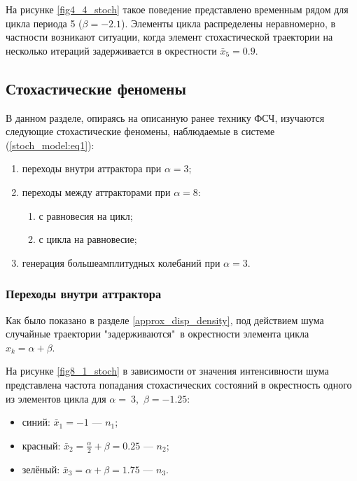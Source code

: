 \documentclass[a4paper, 14pt]{extreport}
\numberwithin{equation}{section}
\numberwithin{figure}{section}
\numberwithin{table}{section}
\begin{document}
				На рисунке \ref{fig4_4_stoch} такое поведение представлено временным рядом для цикла периода 5 ($ \beta = -2.1 $). Элементы цикла распределены неравномерно, в частности возникают ситуации, когда элемент стохастической траектории на несколько итераций задерживается в окрестности $ \bar{x}_{5} = 0.9 $.


		\newpage

		\subsection{Стохастические феномены}
		\label{stoch_phen}
			В данном разделе, опираясь на описанную ранее технику ФСЧ, изучаются следующие стохастические феномены, наблюдаемые в системе (\ref{stoch_model:eq1}):
			\begin{enumerate}
				\item переходы внутри аттрактора при $ \alpha = 3 $;
				\item переходы между аттракторами при $ \alpha = 8 $:
				\begin{enumerate}
					\item с равновесия на цикл;
					\item с цикла на равновесие;
				\end{enumerate}
				\item генерация большеамплитудных колебаний при $ \alpha = 3 $.
			\end{enumerate}
			\subsubsection{Переходы внутри аттрактора}
			\label{stoch_one_attractor}
            	Как было показано в разделе \ref{approx_disp_density}, под действием шума случайные траектории "задерживаются"\ в окрестности элемента цикла $ x_{k} = \alpha + \beta $.

				На рисунке \ref{fig8_1_stoch} в зависимости от значения интенсивности шума представлена частота попадания стохастических состояний в окрестность одного из элементов цикла для $ \alpha =~3 $,~$ \beta = -1.25 $:
                \begin{itemize}
                	\item синий: $ \bar{x}_{1} = -1 $ --- $ n_{1} $;
                    \item красный: $ \bar{x}_{2} = \frac{\alpha}{2} + \beta = 0.25 $ --- $ n_{2} $;
                	\item зелёный: $ \bar{x}_{3} = \alpha + \beta = 1.75 $ --- $ n_{3} $.
                \end{itemize}
\end{document}
